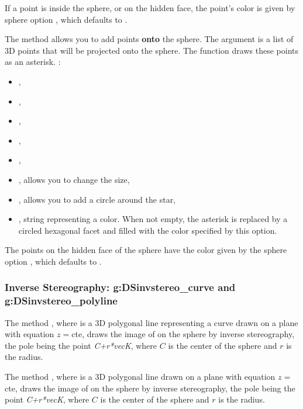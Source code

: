 If a point is inside the sphere, or on the hidden face, the point's color is given by sphere option , which defaults to .

The  method allows you to add points \textbf{onto} the sphere. The  argument is a list of 3D points that will be projected onto the sphere. The function draws these points as an asterisk. \writeoptions:
\begin{itemize}
    \item {},
    \item {},
    \item {},
    \item {},
    \item {},
    \item {}, allows you to change the size,
    \item {}, allows you to add a circle around the star,
    \item {}, string representing a color. When not empty, the asterisk is replaced by a circled hexagonal facet and filled with the color specified by this option.
\end{itemize}

The points on the hidden face of the sphere have the color given by the sphere option , which defaults to .

\subsubsection{Inverse Stereography: g:DSinvstereo\_curve and g:DSinvstereo\_polyline}

The method , where  is a 3D polygonal line representing a curve drawn on a plane with equation $z=$cte, draws the image of  on the sphere by inverse stereography, the pole being the point \emph{C+r*vecK}, where $C$ is the center of the sphere and $r$ is the radius.

The method , where  is a 3D polygonal line drawn on a plane with equation $z=$cte, draws the image of  on the sphere by inverse stereography, the pole being the point \emph{C+r*vecK}, where $C$ is the center of the sphere and $r$ is the radius.

